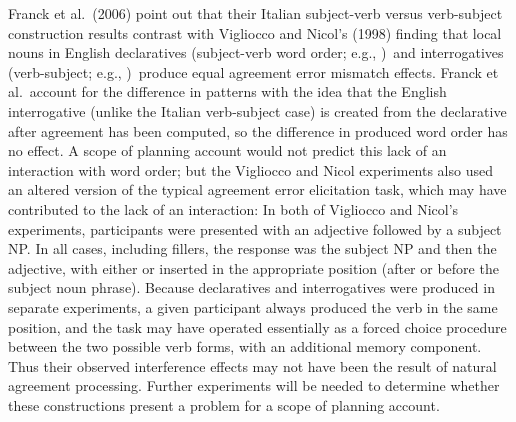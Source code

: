 \documentclass[12pt,titlepage]{article}
\newcommand{\IGNORE}[1]{} %
\begin{document}
\IGNORE{
can't just complain about Exp2 -- same task as Exp1, but Exp2 has fewer 
misc errs (though also longer display times) -- probably best to make it 
an overall issue -- it's just a forced choice task for both expts.  other 
issue is mention in V\&N's GD that they ran another expt pair w/o adj 
presentation (preamble, then head N again, then S produces whole sentence 
or question) -- this expt produced very low err rates (duh) but still no 
decl vs interr diff\ldots --- try the following:}

Franck et al.\ (2006) point out that their Italian subject-verb versus
verb-subject construction results contrast with Vigliocco and Nicol's
(1998) finding that local nouns in English declaratives (subject-verb word
order; e.g., )\ and
interrogatives (verb-subject; e.g., )\ produce equal agreement error mismatch effects.  Franck et al.\
account for the difference in patterns with the idea that the English
interrogative (unlike the Italian verb-subject case) is created from the
declarative after agreement has been computed, so the difference in
produced word order has no effect.  A scope of planning account would not
predict this lack of an interaction with word order; but the Vigliocco and
Nicol experiments also used an altered version of the typical agreement
error elicitation task, which may have contributed to the lack of an
interaction: In both of Vigliocco and Nicol's experiments, participants
were presented with an adjective followed by a subject NP\@.  In all cases,
including fillers, the response was the subject NP and then the adjective,
with either \ext{is} or \ext{are} inserted in the appropriate position
(after or before the subject noun phrase).  Because declaratives and
interrogatives were produced in separate experiments, a given participant
always produced the verb in the same position, and the task may have
operated essentially as a forced choice procedure between the two possible
verb forms, with an additional memory component.  Thus their observed
interference effects may not have been the result of natural agreement
processing.  Further experiments will be needed to determine whether these
constructions present a problem for a scope of planning account.

\IGNORE{---other Franck et al.\ papers?  NO?}

\IGNORE{---explain Bock \& Cutting -- clause-boundedness}
\end{document}
